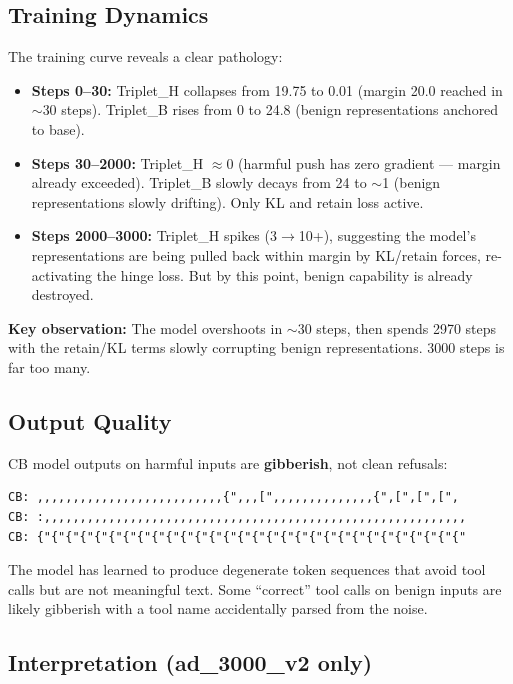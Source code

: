 \documentclass[11pt]{article}
\begin{document}
\subsection{Training Dynamics}

The training curve reveals a clear pathology:
\begin{itemize}
  \item \textbf{Steps 0--30:} Triplet\_H collapses from 19.75 to 0.01 (margin 20.0
        reached in $\sim$30 steps). Triplet\_B rises from 0 to 24.8 (benign
        representations anchored to base).
  \item \textbf{Steps 30--2000:} Triplet\_H $\approx 0$ (harmful push has zero
        gradient --- margin already exceeded). Triplet\_B slowly decays from 24 to
        $\sim$1 (benign representations slowly drifting). Only KL and retain loss
        active.
  \item \textbf{Steps 2000--3000:} Triplet\_H spikes (3$\to$10+), suggesting
        the model's representations are being pulled back within margin by KL/retain
        forces, re-activating the hinge loss. But by this point, benign capability
        is already destroyed.
\end{itemize}

\textbf{Key observation:} The model overshoots in $\sim$30 steps, then spends
2970 steps with the retain/KL terms slowly corrupting benign representations.
3000 steps is far too many.

\subsection{Output Quality}

CB model outputs on harmful inputs are \textbf{gibberish}, not clean refusals:
\begin{verbatim}
CB: ,,,,,,,,,,,,,,,,,,,,,,,,,,{",,,[",,,,,,,,,,,,,,{",[",[",[",
CB: :,,,,,,,,,,,,,,,,,,,,,,,,,,,,,,,,,,,,,,,,,,,,,,,,,,,,,,,,,,,
CB: {"{"{"{"{"{"{"{"{"{"{"{"{"{"{"{"{"{"{"{"{"{"{"{"{"{"{"{"{"{"
\end{verbatim}
The model has learned to produce degenerate token sequences that avoid tool
calls but are not meaningful text. Some ``correct'' tool calls on benign inputs
are likely gibberish with a tool name accidentally parsed from the noise.

\subsection{Interpretation (ad\_3000\_v2 only)}
\end{document}

